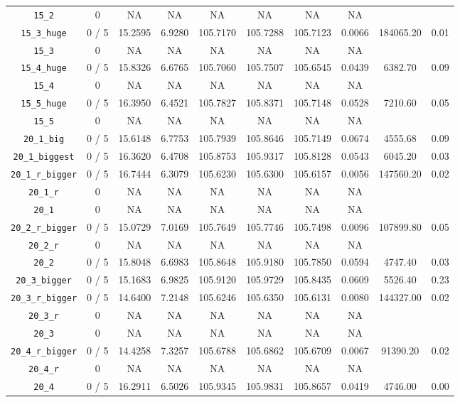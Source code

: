 \documentclass{scrartcl}
\begin{document}
\begin{table}[h!]
\begin{center}
\begin{tabular}{| c | c | c | c | c | c | c | c | c | c |}
\verb|15_2| & 0 & NA & NA & NA & NA & NA & NA & \\ 
\verb|15_3_huge| & 0 / 5 & 15.2595 & 6.9280 & 105.7170 & 105.7288 & 105.7123 & 0.0066 & 184065.20 & 0.01\\ 
\verb|15_3| & 0 & NA & NA & NA & NA & NA & NA & \\ 
\verb|15_4_huge| & 0 / 5 & 15.8326 & 6.6765 & 105.7060 & 105.7507 & 105.6545 & 0.0439 & 6382.70 & 0.09\\ 
\verb|15_4| & 0 & NA & NA & NA & NA & NA & NA & \\ 
\verb|15_5_huge| & 0 / 5 & 16.3950 & 6.4521 & 105.7827 & 105.8371 & 105.7148 & 0.0528 & 7210.60 & 0.05\\ 
\verb|15_5| & 0 & NA & NA & NA & NA & NA & NA & \\ 
\verb|20_1_big| & 0 / 5 & 15.6148 & 6.7753 & 105.7939 & 105.8646 & 105.7149 & 0.0674 & 4555.68 & 0.09\\ 
\verb|20_1_biggest| & 0 / 5 & 16.3620 & 6.4708 & 105.8753 & 105.9317 & 105.8128 & 0.0543 & 6045.20 & 0.03\\ 
\verb|20_1_r_bigger| & 0 / 5 & 16.7444 & 6.3079 & 105.6230 & 105.6300 & 105.6157 & 0.0056 & 147560.20 & 0.02\\ 
\verb|20_1_r| & 0 & NA & NA & NA & NA & NA & NA & \\ 
\verb|20_1| & 0 & NA & NA & NA & NA & NA & NA & \\ 
\verb|20_2_r_bigger| & 0 / 5 & 15.0729 & 7.0169 & 105.7649 & 105.7746 & 105.7498 & 0.0096 & 107899.80 & 0.05\\ 
\verb|20_2_r| & 0 & NA & NA & NA & NA & NA & NA & \\ 
\verb|20_2| & 0 / 5 & 15.8048 & 6.6983 & 105.8648 & 105.9180 & 105.7850 & 0.0594 & 4747.40 & 0.03\\ 
\verb|20_3_bigger| & 0 / 5 & 15.1683 & 6.9825 & 105.9120 & 105.9729 & 105.8435 & 0.0609 & 5526.40 & 0.23\\ 
\verb|20_3_r_bigger| & 0 / 5 & 14.6400 & 7.2148 & 105.6246 & 105.6350 & 105.6131 & 0.0080 & 144327.00 & 0.02\\ 
\verb|20_3_r| & 0 & NA & NA & NA & NA & NA & NA & \\ 
\verb|20_3| & 0 & NA & NA & NA & NA & NA & NA & \\ 
\verb|20_4_r_bigger| & 0 / 5 & 14.4258 & 7.3257 & 105.6788 & 105.6862 & 105.6709 & 0.0067 & 91390.20 & 0.02\\ 
\verb|20_4_r| & 0 & NA & NA & NA & NA & NA & NA & \\ 
\verb|20_4| & 0 / 5 & 16.2911 & 6.5026 & 105.9345 & 105.9831 & 105.8657 & 0.0419 & 4746.00 & 0.00\\ 

\end{tabular}
\end{center}
\end{table}
\end{document}
